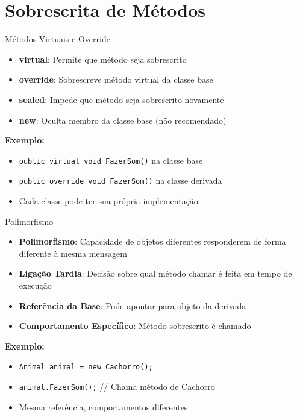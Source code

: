 \documentclass[aspectratio=169]{beamer}
\begin{document}
\section{Sobrescrita de Métodos}

\begin{frame}{Métodos Virtuais e Override}
\begin{itemize}
\item \textbf{virtual}: Permite que método seja sobrescrito
\item \textbf{override}: Sobrescreve método virtual da classe base
\item \textbf{sealed}: Impede que método seja sobrescrito novamente
\item \textbf{new}: Oculta membro da classe base (não recomendado)
\end{itemize}

\vspace{0.5cm}
\textbf{Exemplo:}
\begin{itemize}
\item \texttt{public virtual void FazerSom()} na classe base
\item \texttt{public override void FazerSom()} na classe derivada
\item Cada classe pode ter sua própria implementação
\end{itemize}
\end{frame}

\begin{frame}{Polimorfismo}
\begin{itemize}
\item \textbf{Polimorfismo}: Capacidade de objetos diferentes responderem de forma diferente à mesma mensagem
\item \textbf{Ligação Tardia}: Decisão sobre qual método chamar é feita em tempo de execução
\item \textbf{Referência da Base}: Pode apontar para objeto da derivada
\item \textbf{Comportamento Específico}: Método sobrescrito é chamado
\end{itemize}

\vspace{0.3cm}
\textbf{Exemplo:}
\begin{itemize}
\item \texttt{Animal animal = new Cachorro();}
\item \texttt{animal.FazerSom();} // Chama método de Cachorro
\item Mesma referência, comportamentos diferentes
\end{itemize}
\end{frame}
\end{document}
